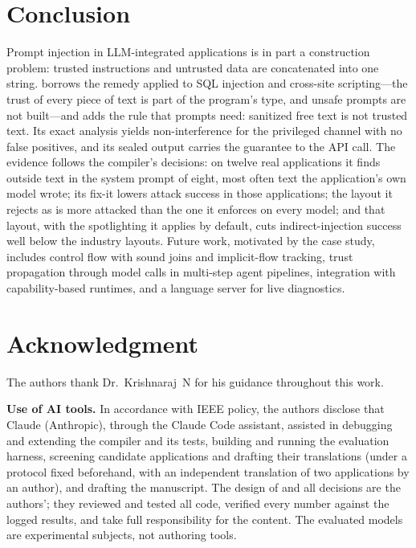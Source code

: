 \documentclass[conference]{IEEEtran}
\begin{document}
\section{Conclusion}

Prompt injection in LLM-integrated applications is in part a construction problem: trusted instructions and untrusted data are concatenated into one string. \TL{} borrows the remedy applied to SQL injection and cross-site scripting---the trust of every piece of text is part of the program's type, and unsafe prompts are not built---and adds the rule that prompts need: sanitized free text is not trusted text. Its exact analysis yields non-interference for the privileged channel with no false positives, and its sealed output carries the guarantee to the API call. The evidence follows the compiler's decisions: on twelve real applications it finds outside text in the system prompt of eight, most often text the application's own model wrote; its fix-it lowers attack success in those applications; the layout it rejects as  is more attacked than the one it enforces on every model; and that layout, with the spotlighting it applies by default, cuts indirect-injection success well below the industry layouts. Future work, motivated by the case study, includes control flow with sound joins and implicit-flow tracking, trust propagation through model calls in multi-step agent pipelines, integration with capability-based runtimes, and a language server for live diagnostics.

\section*{Acknowledgment}

The authors thank Dr.~Krishnaraj~N for his guidance throughout this work.

\textbf{Use of AI tools.} In accordance with IEEE policy, the authors disclose that Claude (Anthropic), through the Claude Code assistant, assisted in debugging and extending the compiler and its tests, building and running the evaluation harness, screening candidate applications and drafting their translations (under a protocol fixed beforehand, with an independent translation of two applications by an author), and drafting the manuscript. The design of \TL{} and all decisions are the authors'; they reviewed and tested all code, verified every number against the logged results, and take full responsibility for the content. The evaluated models are experimental subjects, not authoring tools.



\end{document}
